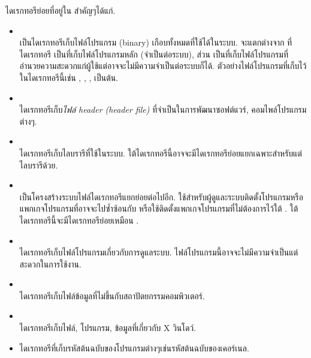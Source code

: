 \begin{thwbr}
ไดเรกทอรีย่อยที่อยู่ใน  สำคัญๆได้แก่.
\begin{itemize}
\item {}\\
เป็นไดเรกทอรีเก็บไฟล์โปรแกรม (binary) เกือบทั้งหมดที่ใช้ได้ในระบบ. จะแตกต่างจาก  ที่ไดเรกทอรี  เป็นที่เก็บไฟล์โปรแกรมหลัก (จำเป็นต่อระบบ), ส่วน  เป็นที่เก็บไฟล์โปรแกรมที่อำนวยความสะดวกแก่ผู้ใช้แต่อาจจะไม่มีความจำเป็นต่อระบบก็ได้. ตัวอย่างไฟล์โปรแกรมที่เก็บไว้ในไดเรกทอรีนี้เช่น , , ,  เป็นต้น.  
\item {}\\
ไดเรกทอรีเก็บ\emph{ไฟล์ header (header file)} ที่จำเป็นในการพัฒนาซอฟต์แวร์, คอมไพล์โปรแกรมต่างๆ.
\item {}\\
ไดเรกทอรีเก็บไลบรารีที่ใช้ในระบบ. ใต้ไดเรกทอรีนี้อาจจะมีไดเรกทอรีย่อยแยกเฉพาะสำหรับแต่ไลบรารีด้วย.
\item {}\\
เป็นโครงสร้างระบบไฟล์ไดเรกทอรีแยกย่อยต่อไปอีก. ใช้สำหรับผู้ดูและระบบติดตั้งโปรแกรมหรือแพกเกจโปรแกรมที่อาจจะไปซ้ำซ้อนกับ  หรือใช้ติดตั้งแพกเกจโปรแกรมที่ไม่ต้องการไว้ใต้ . ใต้ไดเรกทอรีนี้จะมีไดเรกทอรีย่อยเหมือน .
\item {}\\
ไดเรกทอรีเก็บไฟล์โปรแกรมเกี่ยวกับการดูแลระบบ. ไฟล์โปรแกรมนี้อาจจะไม่มีความจำเป็นแต่สะดวกในการใช้งาน.
\item {}\\
ไดเรกทอรีเก็บไฟล์ข้อมูลที่ไม่ขึ้นกับสถาปัตยกรรมคอมพิวเตอร์.
\item {}\\
ไดเรกทอรีเก็บไฟล์, โปรแกรม, ข้อมูลที่เกี่ยวกับ X วินโดว์. 
\item {}
ไดเรกทอรีที่เก็บรหัสต้นฉบับของโปรแกรมต่างๆเช่นรหัสต้นฉบับของเคอร์เนล.
\end{itemize}


\end{thwbr}
